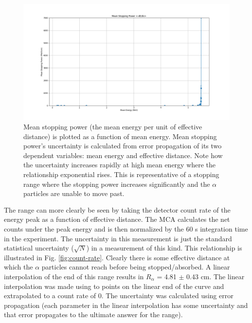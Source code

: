  \begin{figure}
 \centering
 \includegraphics[width=\textwidth]{stopping_power.png}
 \caption{Mean stopping power (the mean energy per unit of effective distance) is plotted as a function of mean energy. Mean stopping power’s uncertainty is calculated from error propagation of its two dependent variables: mean energy and effective distance. Note how the uncertainty increases rapidly at high mean energy where the relationship exponential rises. This is representative of a stopping range where the stopping power increases significantly and the $\alpha$ particles are unable to move past.}
 \label{fig:stopping-power}
 \end{figure}

The range can more clearly be seen by taking the detector count rate of the energy peak as a function of effective distance. The MCA calculates the net counts under the peak energy and is then normalized by the 60 s integration time in the experiment. The uncertainty in this measurement is just the standard statistical uncertainty ($\sqrt{N}$) in a measurement of this kind. This relationship is illustrated in Fig. \ref{fig:count-rate}. Clearly there is some effective distance at which the $\alpha$ particles cannot reach before being stopped/absorbed. A linear interpolation of the end of this range results in $R_{\alpha}$ = 4.81 $\pm$ 0.43 cm. The linear interpolation was made using to points on the linear end of the curve and extrapolated to a count rate of 0. The uncertainty was calculated using error propagation (each parameter in the linear interpolation has some uncertainty and that error propagates to the ultimate answer for the range).

